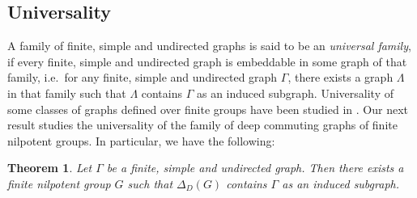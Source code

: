 \documentclass[12pt,a4paper]{article}
\newtheorem{theorem}{Theorem}[section]
\begin{document}
\subsection{Universality}
A family of finite, simple and undirected graphs is said to be an \emph{universal family}, if every finite, simple and undirected graph is embeddable in some graph of that family, i.e.~for any finite, simple and undirected graph $\Gamma$, there exists a graph $\Lambda$ in that family such that $\Lambda$ contains $\Gamma$ as an induced subgraph. Universality of some classes of graphs defined over finite groups have been studied in \cite{biswas, cameron}. Our next result studies the universality of the family of deep commuting graphs of finite nilpotent groups. In particular, we have the following:
\begin{theorem}\label{universality_nilpotent}
Let $\Gamma$ be a finite, simple and undirected graph. Then there exists a finite nilpotent group $G$ such that $\Delta_D(G)$ contains $\Gamma$ as an induced subgraph.    
\end{theorem}
\end{document}
